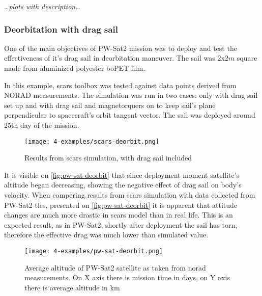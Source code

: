                 \dots\textit{plots with description}\dots

        \subsubsection{Deorbitation with drag sail}
            One of the main objectives of PW-Sat2 mission was to deploy and test the effectiveness of it's drag sail in deorbitation maneuver. The sail was  $2$x$2m$ square made from aluminized polyester boPET film\cite{pwsat2dt}.
            
            In this example, \ac{scars} toolbox was tested against data points derived from NORAD measurements. The simulation was run in two cases: only with drag sail set up and with drag sail and magnetorquers on to keep sail's plane perpendicular to spacecraft's orbit tangent vector. The sail was deployed around 25th day of the mission.
                         
            \begin{figure}[H]
                \centering
                \texttt{[image: 4-examples/scars-deorbit.png]}
                \caption{Results from \ac{scars} simulation, with drag sail included}
                \label{fig:scars-deorbit}
            \end{figure}

            It is visible on \autoref{fig:pw-sat-deorbit} that since deployment moment satellite's altitude began decreasing, showing the negative effect of drag sail on body's velocity. When compering results from \ac{scars} simulation with data collected from PW-Sat2 \ac{tle}s, presented on \autoref{fig:pw-sat-deorbit} it is apparent that attitude changes are much more drastic in \ac{scars} model than in real life. This is an expected result, as in PW-Sat2, shortly after deployment the sail has torn, therefore the effective drag was much lower than simulated value\cite{space24_pwsat}. 
            
            \begin{figure}[H]
                \centering
                \texttt{[image: 4-examples/pw-sat-deorbit.png]}
                \caption{Average altitude of PW-Sat2 satellite as taken from \ac{norad} measurements. On X axis there is mission time in days, on Y axis there is average altitude in km\cite{pw_sat2_deorbit}}
                \label{fig:pw-sat-deorbit}
            \end{figure}
            
